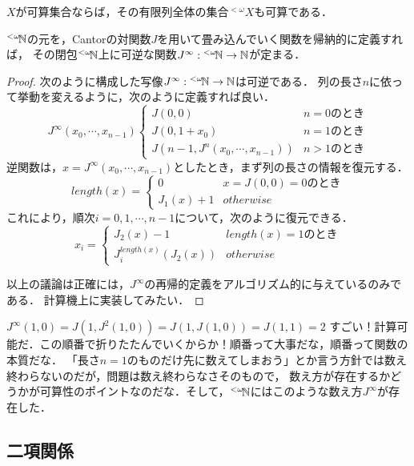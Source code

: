 \documentclass[uplatex, dvipdfmx]{jsreport}
\begin{document}
\begin{proposition}\label{prop-cardinality-of-expressions}
    $X$が可算集合ならば，その有限列全体の集合${}^{<\omega}\!X$も可算である．
\end{proposition}
\begin{remark}
    ${}^{<\omega}\!\mathbb{N}$の元を，Cantorの対関数$J$を用いて畳み込んでいく関数を帰納的に定義すれば，
    その閉包${}^{<\omega}\!\mathbb{N}$上に可逆な関数$J^\infty:{}^{<\omega}\!\mathbb{N}\to\mathbb{N}$が定まる．
\end{remark}
\begin{proof}
    次のように構成した写像$J^\infty:{}^{<\omega}\!\mathbb{N}\to\mathbb{N}$は可逆である．
    列の長さ$n$に依って挙動を変えるように，次のように定義すれば良い．
    \[J^\infty(x_0,\cdots,x_{n-1})\begin{cases}
        J(0,0) &n=0のとき\\
        J(0,1+x_0) &n=1のとき\\
        J(n-1,J^n(x_0,\cdots,x_{n-1})) &n>1のとき
    \end{cases}\]
    逆関数は，$x=J^\infty(x_0,\cdots,x_{n-1})$としたとき，まず列の長さの情報を復元する．
    \[length(x)=\begin{cases}
        0 &x=J(0,0)=0のとき\\
        J_1(x)+1 &otherwise
    \end{cases}\]
    これにより，順次$i=0,1,\cdots,n-1$について，次のように復元できる．
    \[x_i=\begin{cases}
        J_2(x)-1 &length(x)=1のとき\\
        J_i^{length(x)}(J_2(x)) &otherwise
    \end{cases}\]
    
    以上の議論は正確には，$J^\infty$の再帰的定義をアルゴリズム的に与えているのみである．
    計算機上に実装してみたい．
\end{proof}

\begin{example}
    $J^\infty(1,0)=J(1,J^2(1,0))=J(1,J(1,0))=J(1,1)=2$
    すごい！計算可能だ．この順番で折りたたんでいくからか！順番って大事だな，順番って関数の本質だな．
    「長さ$n=1$のものだけ先に数えてしまおう」とか言う方針では数え終わらないのだが，問題は数え終わらなさそのもので，
    数え方が存在するかどうかが可算性のポイントなのだな．そして，${}^{<\omega}\!\mathbb{N}$にはこのような数え方$J^\infty$が存在した．
\end{example}

\subsection{二項関係}
\end{document}
